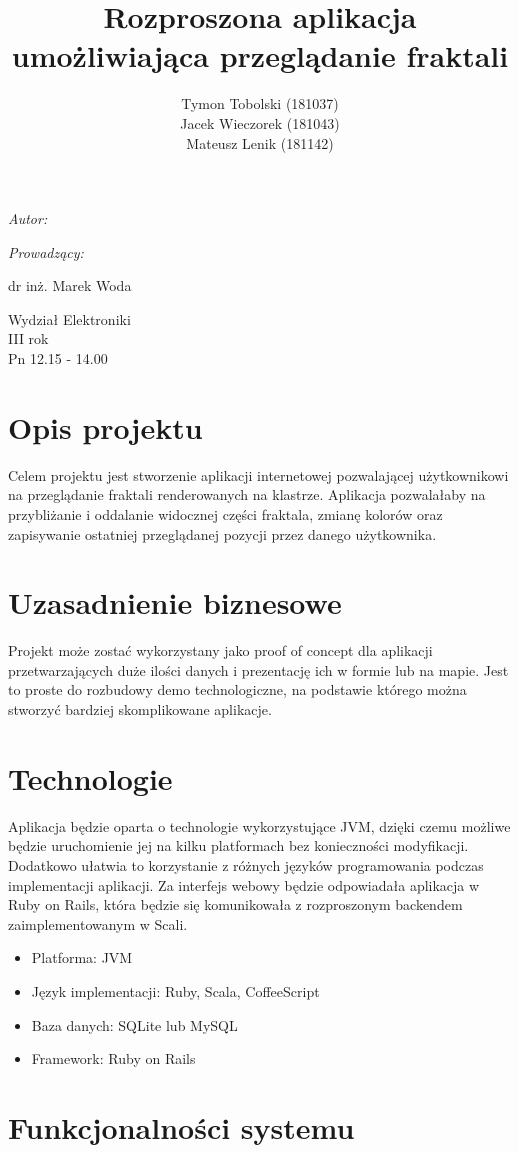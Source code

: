 \documentclass[wide,a4paper,titlepage,12pt]{article}
\title{Rozproszona aplikacja umożliwiająca przeglądanie fraktali}
\author{Tymon Tobolski {\small(181037)}\\ Jacek Wieczorek {\small(181043)} \\
Mateusz Lenik {\small(181142)}}
\makeatletter
\renewcommand{\maketitle}{
  \begin{titlepage}
    \begin{center}
      \vspace*{3cm}
      \LARGE \@title \par
      \vspace{2cm}
      \textit{\small Autor:}\par
      \normalsize \@author\par \normalsize
      \vspace{3cm}
      \textit{\small Prowadzący:}\par
      dr inż. Marek Woda \par
      \vspace{2cm}
      Wydział Elektroniki\\ III rok\\ Pn 12.15 - 14.00\par

    \end{center}
  \end{titlepage}
}
\makeatother
\begin{document}
\maketitle
\tableofcontents
\newpage

\section{Opis projektu}

Celem projektu jest stworzenie aplikacji internetowej pozwalającej użytkownikowi
na przeglądanie fraktali renderowanych na klastrze. Aplikacja
pozwalałaby na przybliżanie i oddalanie widocznej części fraktala, zmianę
kolorów oraz zapisywanie ostatniej przeglądanej pozycji przez danego
użytkownika.

\section{Uzasadnienie biznesowe}

Projekt może zostać wykorzystany jako proof of concept dla aplikacji
przetwarzających duże ilości danych i prezentację ich w formie lub na mapie.
Jest to proste do rozbudowy demo technologiczne, na podstawie którego można
stworzyć bardziej skomplikowane aplikacje.

\section{Technologie}

Aplikacja będzie oparta o technologie wykorzystujące JVM, dzięki czemu możliwe
będzie uruchomienie jej na kilku platformach bez konieczności modyfikacji.
Dodatkowo ułatwia to korzystanie z różnych języków programowania podczas
implementacji aplikacji. Za interfejs webowy będzie odpowiadała aplikacja w Ruby
on Rails, która będzie się komunikowała z rozproszonym backendem
zaimplementowanym w Scali.

\begin{itemize}
  \item Platforma: JVM
  \item Język implementacji: Ruby, Scala, CoffeeScript
  \item Baza danych: SQLite lub MySQL
  \item Framework: Ruby on Rails
\end{itemize}

\newpage
\section{Funkcjonalności systemu}
\end{document}

